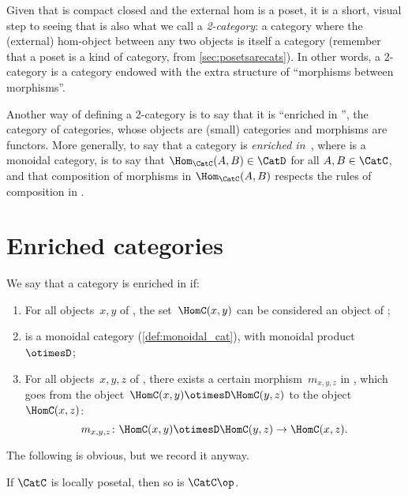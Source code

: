 Given that \DP is compact closed and the external hom is a poset, it is a short, visual step to seeing that \DP is also what we call a \emph{2-category}: a category where the (external) hom-object between any two objects is itself a category (remember that a poset is a kind of category, from \cref{sec:posetsarecats}). In other words, a 2-category is a category endowed with the extra structure of ``morphisms between morphisms''.

Another way of defining a 2-category is to say that it is ``enriched in \Category'', the category of categories, whose objects are (small) categories and morphisms are functors. More generally, to say that a category \CatC is \emph{enriched in~\CatD}, where \CatD is a monoidal category, is to say that $\Hom_\CatC(A,B) \in \CatD$ for all $A,B \in \CatC$, and that composition of morphisms in $\Hom_\CatC(A,B)$ respects the rules of composition in \CatD.


\section{Enriched categories}\label{sec:enrichment-enriched-categories}

\begin{ctdefinition}
  \label{def:enriched-category}
  We say that a category \CatC is enriched in \CatD if:
  \begin{enumerate}
    \item For all objects~$x, y$ of \CatC, the set~$\HomC(x,y)$ can be considered an object of \CatD;
    \item \CatD is a monoidal category (\cref{def:monoidal_cat}),
    with monoidal product~$\otimesD$;
    \item For all objects~$x, y, z$ of \CatC, there exists
    a certain morphism~$m_{x,y,z}$ in \CatD,
    which goes from the object~$\HomC(x, y) \otimesD \HomC(y, z)$ to the object~$\HomC(x, z)$:
    \begin{equation}
      \label{eq:enriched-condition}
      m_{x,y,z} \colon \HomC(x, y) \otimesD \HomC(y, z) \to \HomC(x, z).
    \end{equation}
  \end{enumerate}
\end{ctdefinition}

%
The following is obvious, but we record it anyway.
\begin{lemma}
  \label{lem:loc_pos_op}
  If $\CatC$ is locally posetal, then so is $\CatC\op$.
\end{lemma}

